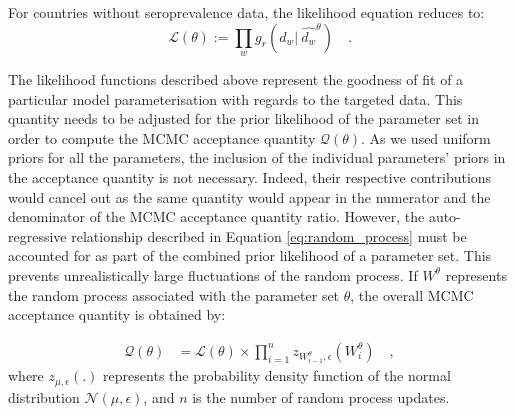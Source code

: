For countries without seroprevalence data, the likelihood equation reduces to:
\begin{equation}
    \label{eq:likelihood_nosero}
    \mathcal{L}(\theta) := \prod_w g_r(d_w | \:\hat{d_w}^\theta) \quad.
\end{equation}

The likelihood functions described above represent the goodness of fit of a particular model parameterisation with regards to the targeted data. 
This quantity needs to be adjusted for the prior likelihood of the parameter set in order to compute the MCMC acceptance quantity $\mathcal{Q}(\theta)$.
As we used uniform priors for all the parameters, the inclusion of the individual parameters' priors in the acceptance quantity is not necessary. 
Indeed, their respective contributions would cancel out as the same quantity would appear in the numerator and the denominator of the 
MCMC acceptance quantity ratio. However, the auto-regressive relationship described in Equation \ref{eq:random_process}
must be accounted for as part of the combined prior likelihood of a parameter set. This prevents unrealistically large fluctuations of the random process.
If $W^\theta$ represents the random process associated with the parameter set $\theta$, the overall MCMC acceptance quantity is obtained by:

\begin{equation}
    \label{eq:acc_qtt}
    \begin{split}
    \mathcal{Q}(\theta) & = \mathcal{L}(\theta) \times \prod_{i=1}^{n} z_{W^\theta_{i-1},\epsilon}(W^\theta_i) \quad ,
    \end{split}
\end{equation}
where $z_{\mu,\epsilon}(.)$ represents the probability density function of the normal distribution $\mathcal{N}(\mu, \epsilon)$, and $n$ is the number 
of random process updates.


